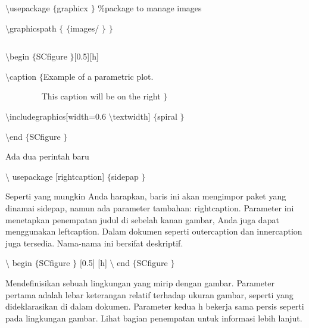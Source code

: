 \noindent 
 $  $ \par
\noindent 
 $  \setminus $usepackage $  \{  $graphicx $  \}  $  $  \%  $package to manage images \par
\vspace{12pt}
\noindent 
 $  \setminus $graphicspath $  \{  $  $  \{  $images/ $  \}  $  $  \}  $ \par
\noindent 
 $  $ \par
\noindent 
 $  \setminus $begin $  \{  $SCfigure $  \}  $[0.5][h] \par
\vspace{12pt}
\noindent 
 $  \setminus $caption $  \{  $Example of a parametric plot. \par
\noindent 
  \par
\noindent 
~~~~~~~~ This caption will be on the right $  \}  $ \par
\vspace{12pt}
\noindent 
 $  \setminus $includegraphics[width=0.6 $  \setminus $textwidth] $  \{  $spiral $  \}  $ \par
\vspace{12pt}
\noindent 
 $  \setminus $end $  \{  $SCfigure $  \}  $ \par
\vspace{16pt}
\vspace{16pt}
\noindent 
Ada dua perintah baru \par
\vspace{12pt}
\noindent 
 $  \setminus $ usepackage [rightcaption]  $  \{  $sidepap $  \}  $ \par
\noindent 
Seperti yang mungkin Anda harapkan, baris ini akan mengimpor paket yang dinamai sidepap, namun ada parameter tambahan: rightcaption. Parameter ini menetapkan penempatan judul di sebelah kanan gambar, Anda juga dapat menggunakan leftcaption. Dalam dokumen seperti outercaption dan innercaption juga tersedia. Nama-nama ini bersifat deskriptif. \par
\vspace{12pt}
\noindent 
 $  \setminus $ begin  $  \{  $SCfigure $  \}  $ [0.5] [h]  $  \setminus $ end  $  \{  $SCfigure $  \}  $ \par
\noindent 
Mendefinisikan sebuah lingkungan yang mirip dengan gambar. Parameter pertama adalah lebar keterangan relatif terhadap ukuran gambar, seperti yang dideklarasikan di dalam dokumen. Parameter kedua h bekerja sama persis seperti pada lingkungan gambar. Lihat bagian penempatan untuk informasi lebih lanjut. \par
\vspace{12pt}
